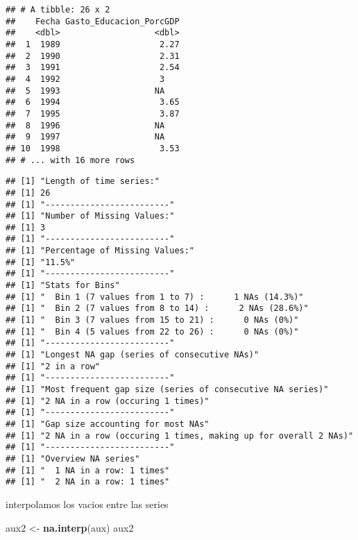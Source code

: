 \documentclass[]{book}
\newenvironment{Shaded}{\begin{snugshade}}{\end{snugshade}}
\newcommand{\KeywordTok}[1]{\textcolor[rgb]{0.13,0.29,0.53}{\textbf{#1}}}
\newcommand{\StringTok}[1]{\textcolor[rgb]{0.31,0.60,0.02}{#1}}
\newcommand{\OperatorTok}[1]{\textcolor[rgb]{0.81,0.36,0.00}{\textbf{#1}}}
\newcommand{\NormalTok}[1]{#1}
\theoremstyle{definition}
\theoremstyle{definition}
\theoremstyle{definition}
\theoremstyle{remark}
\begin{document}
\begin{verbatim}
## # A tibble: 26 x 2
##    Fecha Gasto_Educacion_PorcGDP
##    <dbl>                   <dbl>
##  1  1989                    2.27
##  2  1990                    2.31
##  3  1991                    2.54
##  4  1992                    3   
##  5  1993                   NA   
##  6  1994                    3.65
##  7  1995                    3.87
##  8  1996                   NA   
##  9  1997                   NA   
## 10  1998                    3.53
## # ... with 16 more rows
\end{verbatim}

\begin{Shaded}
\end{Shaded}

\begin{verbatim}
## [1] "Length of time series:"
## [1] 26
## [1] "-------------------------"
## [1] "Number of Missing Values:"
## [1] 3
## [1] "-------------------------"
## [1] "Percentage of Missing Values:"
## [1] "11.5%"
## [1] "-------------------------"
## [1] "Stats for Bins"
## [1] "  Bin 1 (7 values from 1 to 7) :      1 NAs (14.3%)"
## [1] "  Bin 2 (7 values from 8 to 14) :      2 NAs (28.6%)"
## [1] "  Bin 3 (7 values from 15 to 21) :      0 NAs (0%)"
## [1] "  Bin 4 (5 values from 22 to 26) :      0 NAs (0%)"
## [1] "-------------------------"
## [1] "Longest NA gap (series of consecutive NAs)"
## [1] "2 in a row"
## [1] "-------------------------"
## [1] "Most frequent gap size (series of consecutive NA series)"
## [1] "2 NA in a row (occuring 1 times)"
## [1] "-------------------------"
## [1] "Gap size accounting for most NAs"
## [1] "2 NA in a row (occuring 1 times, making up for overall 2 NAs)"
## [1] "-------------------------"
## [1] "Overview NA series"
## [1] "  1 NA in a row: 1 times"
## [1] "  2 NA in a row: 1 times"
\end{verbatim}

interpolamos los vacios entre las series

\begin{Shaded}
\begin{Highlighting}[]
\NormalTok{aux2 <-}\StringTok{ }\KeywordTok{na.interp}\NormalTok{(aux)}
\NormalTok{aux2}
\end{Highlighting}
\end{Shaded}
\end{document}
